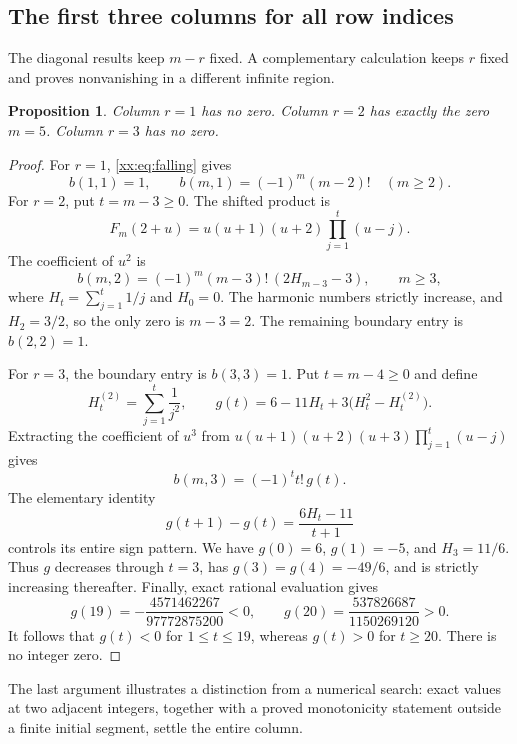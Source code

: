 \documentclass[11pt,a4paper]{article}
\numberwithin{equation}{section}
\newtheorem{proposition}[theorem]{Proposition}
\theoremstyle{definition}
\theoremstyle{remark}
\theoremstyle{plain}
\begin{document}
\subsection{The first three columns for all row indices}\label{xx:sec:columns}

The diagonal results keep $m-r$ fixed. A complementary calculation keeps
$r$ fixed and proves nonvanishing in a different infinite region.

\begin{proposition}\label{xx:prop:firstcolumns}
Column $r=1$ has no zero. Column $r=2$ has exactly the zero $m=5$.
Column $r=3$ has no zero.
\end{proposition}
\begin{proof}
For $r=1$, \eqref{xx:eq:falling} gives
\[
 b(1,1)=1,\qquad b(m,1)=(-1)^m(m-2)!\quad(m\ge2).
\]
For $r=2$, put $t=m-3\ge0$. The shifted product is
\[
 F_m(2+u)=u(u+1)(u+2)\prod_{j=1}^{t}(u-j).
\]
The coefficient of $u^2$ is
\begin{equation}\label{xx:eq:col2}
 b(m,2)=(-1)^m(m-3)!\,(2H_{m-3}-3),\qquad m\ge3,
\end{equation}
where $H_t=\sum_{j=1}^t1/j$ and $H_0=0$. The harmonic numbers strictly
increase, and $H_2=3/2$, so the only zero is $m-3=2$. The remaining
boundary entry is $b(2,2)=1$.

For $r=3$, the boundary entry is $b(3,3)=1$. Put $t=m-4\ge0$ and define
\[
 H_t^{(2)}=\sum_{j=1}^t\frac1{j^2},\qquad
 g(t)=6-11H_t+3\bigl(H_t^2-H_t^{(2)}\bigr).
\]
Extracting the coefficient of $u^3$ from
$u(u+1)(u+2)(u+3)\prod_{j=1}^t(u-j)$ gives
\begin{equation}\label{xx:eq:col3}
 b(m,3)=(-1)^t t!\,g(t).
\end{equation}
The elementary identity
\begin{equation}\label{xx:eq:gdiff}
 g(t+1)-g(t)=\frac{6H_t-11}{t+1}
\end{equation}
controls its entire sign pattern. We have $g(0)=6$, $g(1)=-5$, and
$H_3=11/6$. Thus $g$ decreases through $t=3$, has
$g(3)=g(4)=-49/6$, and is strictly increasing thereafter.
Finally, exact rational evaluation gives
\[
 g(19)=-\frac{4571462267}{97772875200}<0,\qquad
 g(20)=\frac{537826687}{1150269120}>0.
\]
It follows that $g(t)<0$ for $1\le t\le19$, whereas $g(t)>0$ for
$t\ge20$. There is no integer zero.
\end{proof}

The last argument illustrates a distinction from a numerical search: exact
values at two adjacent integers, together with a proved monotonicity
statement outside a finite initial segment, settle the entire column.
\end{document}
